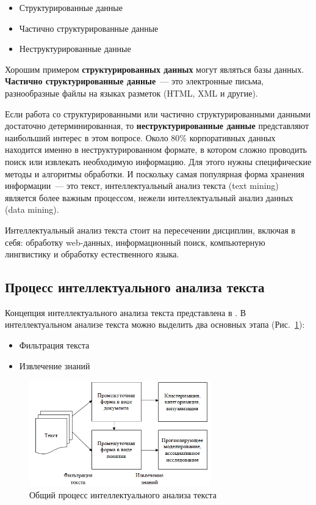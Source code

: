 \documentclass[14pt]{matmex-diploma-custom}
\begin{document}
\begin{itemize}
\item Структурированные данные
\item Частично структурированные данные
\item Неструктурированные данные
\end{itemize}

Хорошим примером \textbf{структурированных данных} могут являться базы данных. \textbf{Частично структурированные данные}~--- это электронные письма, разнообразные файлы на языках разметок (HTML, XML и другие).

Если работа со структурированными или частично структурированными данными достаточно детерминированная, то \textbf{неструктурированные данные} представляют наибольший интерес в этом вопросе. Около 80\% корпоративных данных находится именно в неструктурированном формате, в котором сложно проводить поиск или извлекать необходимую информацию. Для этого нужны специфические методы и алгоритмы обработки. И поскольку самая популярная форма хранения информации~--- это текст, интеллектуальный анализ текста (text mining) является более важным процессом, нежели интеллектуальный анализ данных (data mining).

Интеллектуальный анализ текста стоит на пересечении дисциплин, включая в себя: обработку web-данных, информационный поиск, компьютерную лингвистику и обработку естественного языка.

\subsection{Процесс интеллектуального анализа текста}

Концепция интеллектуального анализа текста представлена в \cite{article:text_mining}. В интеллектуальном анализе текста можно выделить два основных этапа (Рис.~\ref{img:text_mining}):

\begin{itemize}
\item Фильтрация текста
\item Извлечение знаний
\end{itemize}

\begin{figure}[h]
\centering
\includegraphics[width=0.7\textwidth]{img/text_mining}
\caption{Общий процесс интеллектуального анализа текста}
\label{img:text_mining}
\end{figure}
\end{document}
